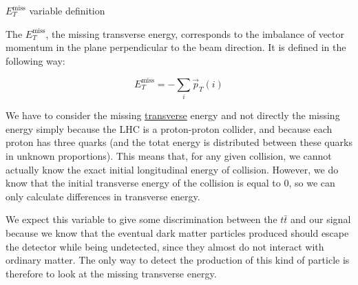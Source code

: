\documentclass[8 pt]{beamer}
\begin{document}
\begin{frame}{$E_T^{\text{miss}}$ variable definition}

   	\justifying
	The $E_T^{\text{miss}}$, the missing transverse energy, corresponds to the imbalance of vector momentum in the plane perpendicular to the beam direction. It is defined in the following way: \vfill
	
	\begin{equation*}
		E_T^{\text{miss}} = -\sum_i{\overrightarrow{p}_T(i)}
	\end{equation*} \vfill
	
	\justifying
	We have to consider the missing \underline{transverse} energy and not directly the missing energy simply because the LHC is a proton-proton collider, and because each proton has three quarks (and the totat energy is distributed between these quarks in unknown proportions). This means that, for any given collision, we cannot actually know the exact initial longitudinal energy of collision. However, we do know that the initial transverse energy of the collision is equal to 0, so we can only calculate differences in transverse energy. \vfill
	
	\begin{block}{}
	\vspace{5pt}
	\justifying
	We expect this variable to give some discrimination between the $t \bar t$ and our signal because we know that the eventual dark matter particles produced should escape the detector while being undetected, since they almost do not interact with ordinary matter.  The only way to detect the production of this kind of particle is therefore to look at the missing transverse energy. \vspace{5pt}
	\end{block} \vfill

\end{frame}
\end{document}
